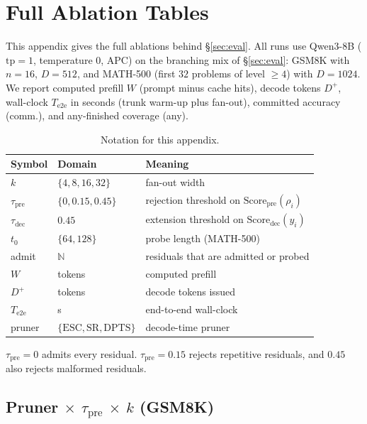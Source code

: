 \section{Full Ablation Tables}
\label{sec:ablation-full}

This appendix gives the full ablations behind \S\ref{sec:eval}.
All runs use Qwen3-8B ($\mathrm{tp}{=}1$, temperature $0$, APC) on the branching mix of \S\ref{sec:eval}:
GSM8K with $n{=}16$, $D{=}512$, and MATH-500 (first $32$ problems of level $\ge4$) with $D{=}1024$.
We report computed prefill $W$ (prompt minus cache hits), decode tokens $D^{+}$, wall-clock $T_{\mathrm{e2e}}$ in seconds (trunk warm-up plus fan-out),
committed accuracy (comm.), and any-finished coverage (any).

\begin{table}[t]
\centering
\caption{Notation for this appendix.}
\label{tab:notation}
\scriptsize
\begin{tabular}{@{}llp{}@{}}
\toprule
Symbol & Domain & Meaning \\
\midrule
$k$ & $\{4,8,16,32\}$ & fan-out width \\
$\tau_{\mathrm{pre}}$ & $\{0,0.15,0.45\}$ & rejection threshold on $\mathrm{Score}_{\mathrm{pre}}(\rho_i)$ \\
$\tau_{\mathrm{dec}}$ & $0.45$ & extension threshold on $\mathrm{Score}_{\mathrm{dec}}(y_i)$ \\
$t_0$ & $\{64,128\}$ & probe length (MATH-500) \\
admit & $\mathbb{N}$ & residuals that are admitted or probed \\
$W$ & tokens & computed prefill \\
$D^{+}$ & tokens & decode tokens issued \\
$T_{\mathrm{e2e}}$ & s & end-to-end wall-clock \\
pruner & $\{\mathrm{ESC},\mathrm{SR},\mathrm{DPTS}\}$ & decode-time pruner \\
\bottomrule
\end{tabular}
\end{table}
$\tau_{\mathrm{pre}}{=}0$ admits every residual.
$\tau_{\mathrm{pre}}{=}0.15$ rejects repetitive residuals, and $0.45$ also rejects malformed residuals.

\subsection{Pruner $\times$ $\tau_{\mathrm{pre}}$ $\times$ $k$ (GSM8K)}
\label{sec:ablate-thresh}

